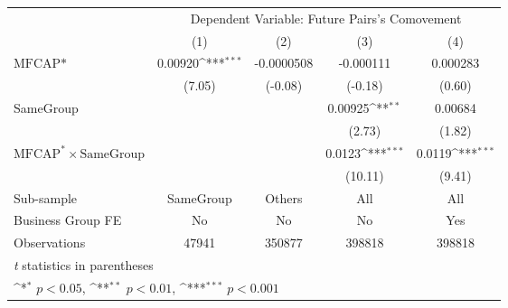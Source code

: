 {
\def\sym#1{\ifmmode^{#1}\else\(^{#1}\)\fi}
\begin{tabular}{l*{4}{c}}
\hline\hline
                &\multicolumn{4}{c}{Dependent Variable:  Future Pairs's Comovement}         \\\cmidrule(lr){2-5}
                &\multicolumn{1}{c}{(1)}         &\multicolumn{1}{c}{(2)}         &\multicolumn{1}{c}{(3)}         &\multicolumn{1}{c}{(4)}         \\
\hline
$ \text{MFCAP*} $&  0.00920\sym{***}&-0.0000508         &-0.000111         & 0.000283         \\
                &   (7.05)         &  (-0.08)         &  (-0.18)         &   (0.60)         \\
[1em]
SameGroup       &                  &                  &  0.00925\sym{**} &  0.00684         \\
                &                  &                  &   (2.73)         &   (1.82)         \\
[1em]
 $ \text{MFCAP}^* \times {\text{SameGroup} }  $ &                  &                  &   0.0123\sym{***}&   0.0119\sym{***}\\
                &                  &                  &  (10.11)         &   (9.41)         \\
\hline
Sub-sample      &SameGroup         &   Others         &      All         &      All         \\
Business Group FE&       No         &       No         &       No         &      Yes         \\
Observations    &    47941         &   350877         &   398818         &   398818         \\
\hline\hline
\multicolumn{5}{l}{\footnotesize \textit{t} statistics in parentheses}\\
\multicolumn{5}{l}{\footnotesize \sym{*} \(p<0.05\), \sym{**} \(p<0.01\), \sym{***} \(p<0.001\)}\\
\end{tabular}
}
